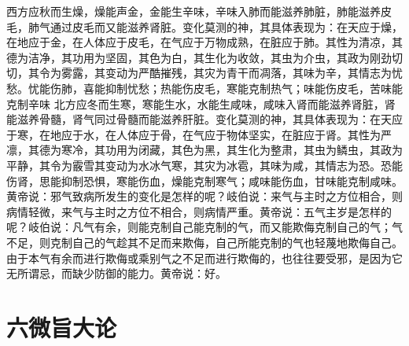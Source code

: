\documentclass[12pt,UTF8]{ctexbook}
\begin{document}
西方应秋而生燥，燥能声金，金能生辛味，辛味入肺而能滋养肺脏，肺能滋养皮毛，肺气通过皮毛而又能滋养肾脏。变化莫测的神，其具体表现为：在天应于燥，在地应于金，在人体应于皮毛，在气应于万物成熟，在脏应于肺。其性为清凉，其德为洁净，其功用为坚固，其色为白，其生化为收敛，其虫为介虫，其政为刚劲切切，其令为雾露，其变动为严酷摧残，其灾为青干而凋落，其味为辛，其情志为忧愁。忧能伤肺，喜能抑制忧愁；热能伤皮毛，寒能克制热气；味能伤皮毛，苦味能克制辛味
北方应冬而生寒，寒能生水，水能生咸味，咸味入肾而能滋养肾脏，肾能滋养骨髓，肾气同过骨髓而能滋养肝脏。变化莫测的神，其具体表现为：在天应于寒，在地应于水，在人体应于骨，在气应于物体坚实，在脏应于肾。其性为严凛，其德为寒冷，其功用为闭藏，其色为黑，其生化为整肃，其虫为鳞虫，其政为平静，其令为霰雪其变动为水冰气寒，其灾为冰雹，其味为咸，其情志为恐。恐能伤肾，思能抑制恐惧，寒能伤血，燥能克制寒气；咸味能伤血，甘味能克制咸味。
黄帝说：邪气致病所发生的变化是怎样的呢？岐伯说：来气与主时之方位相合，则病情轻微，来气与主时之方位不相合，则病情严重。黄帝说：五气主岁是怎样的呢？岐伯说：凡气有余，则能克制自己能克制的气，而又能欺侮克制自己的气；气不足，则克制自己的气趁其不足而来欺侮，自己所能克制的气也轻蔑地欺侮自己。由于本气有余而进行欺侮或乘别气之不足而进行欺侮的，也往往要受邪，是因为它无所谓忌，而缺少防御的能力。黄帝说：好。

\chapter{六微旨大论}
\end{document}
